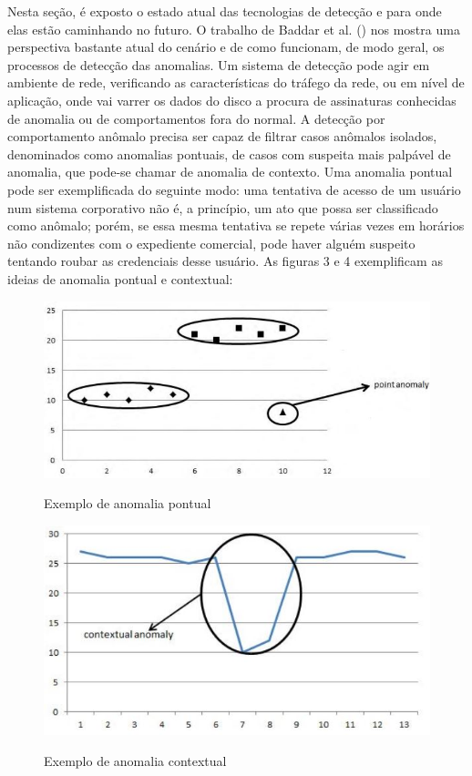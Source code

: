 Nesta seção, é exposto o estado atual das tecnologias de
detecção e para onde elas estão caminhando no futuro. O trabalho de
Baddar et al. (\citeyear{baddarxx}) nos mostra uma perspectiva bastante atual do cenário e
de como funcionam, de modo geral, os processos de detecção das anomalias. Um
sistema de detecção pode agir em ambiente de rede, verificando as
características do tráfego da rede, ou em nível de aplicação, onde vai varrer
os dados do disco a procura de assinaturas conhecidas de anomalia ou de
comportamentos fora do normal. A detecção por comportamento anômalo precisa
ser capaz de filtrar casos anômalos isolados, denominados como anomalias
pontuais, de casos com suspeita mais palpável de anomalia, que pode-se chamar de
anomalia de contexto. Uma anomalia pontual pode ser exemplificada do seguinte
modo: uma tentativa de acesso de um usuário num sistema corporativo não é, a
princípio, um ato que possa ser classificado como anômalo; porém, se essa
mesma tentativa se repete várias vezes em horários não condizentes com o
expediente comercial, pode haver alguém suspeito tentando roubar as
credenciais desse usuário. As figuras 3 e 4 exemplificam as ideias de
anomalia pontual e contextual:

\begin{figure}[H]
\caption{\small Exemplo de anomalia pontual}
\centering
\includegraphics[scale=0.6]{figs/anomalia_pontual.JPG}
\label{f.anomalia_pontual}
\end{figure}

\begin{figure}[H]
\caption{\small Exemplo de anomalia contextual}
\centering
\includegraphics[scale=0.6]{figs/anomalia_contextual.JPG}
\label{f.contextual}
\end{figure}

